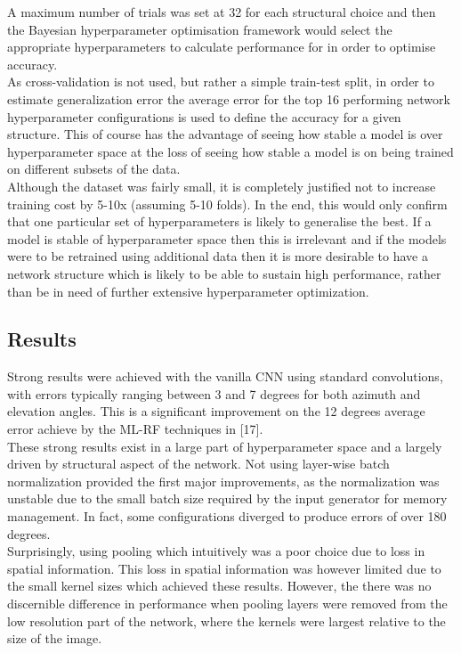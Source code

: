 \documentclass{article}
\begin{document}
A maximum number of trials was set at 32 for each structural choice and then the Bayesian hyperparameter optimisation framework would select the appropriate hyperparameters to calculate performance for in order to optimise accuracy. \\

As cross-validation is not used, but rather a simple train-test split, in order to estimate generalization error the average error for the top 16 performing network hyperparameter configurations is used to define the accuracy for a given structure. This of course has the advantage of seeing how stable a model is over hyperparameter space at the loss of seeing how stable a model is on being trained on different subsets of the data.\\

Although the dataset was fairly small, it is completely justified not to increase training cost by 5-10x (assuming 5-10 folds). In the end, this would only confirm that one particular set of hyperparameters is likely to generalise the best. If a model is stable of hyperparameter space then this is irrelevant and if the models were to be retrained using additional data then it is more desirable to have a network structure which is likely to be able to sustain high performance, rather than be in need of further extensive hyperparameter optimization.\\


\subsection*{Results}
Strong results were achieved with the vanilla CNN using standard convolutions, with errors typically ranging between 3 and 7 degrees for both azimuth and elevation angles. This is a significant improvement on the 12 degrees average error achieve by the ML-RF techniques in [17]. \\

These strong results exist in a large part of hyperparameter space and a largely driven by structural aspect of the network. Not using layer-wise batch normalization provided the first major improvements, as the normalization was unstable due to the small batch size required by the input generator for memory management. In fact, some configurations diverged to produce errors of over 180 degrees.\\

Surprisingly, using pooling which intuitively was a poor choice due to loss in spatial information. This loss in spatial information was however limited due to the small kernel sizes which achieved these results. However, the there was no discernible difference in performance when pooling layers were removed from the low resolution part of the network, where the kernels were largest relative to the size of the image. \\
\end{document}
